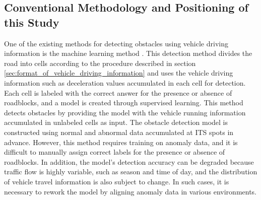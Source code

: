 \documentclass[paper]{ieice}
\begin{document}
\subsection{Conventional Methodology and Positioning of this Study}
\label{sec:conventional_methodology_and_positioning_of_this_study}
%
One of the existing methods for detecting obstacles using vehicle driving information is the machine learning method \cite{tadokoro}.
%
This detection method divides the road into cells according to the procedure described in section \ref{sec:format_of_vehicle_driving_information} and uses the vehicle driving information such as deceleration values accumulated in each cell for detection.
%
Each cell is labeled with the correct answer for the presence or absence of roadblocks, and a model is created through supervised learning.
%
This method detects obstacles by providing the model with the vehicle running information accumulated in unlabeled cells as input.
%
The obstacle detection model is constructed using normal and abnormal data accumulated at ITS spots in advance.
%
However, this method requires training on anomaly data, and it is difficult to manually assign correct labels for the presence or absence of roadblocks.
%
In addition, the model's detection accuracy can be degraded because traffic flow is highly variable, such as season and time of day, and the distribution of vehicle travel information is also subject to change.
%
In such cases, it is necessary to rework the model by aligning anomaly data in various environments.
%
\par
%
\end{document}
